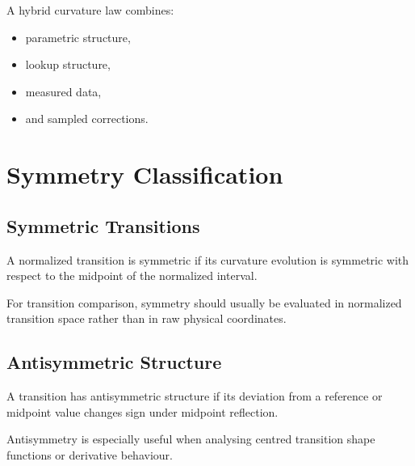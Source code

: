 \begin{definition}
\label{def:hybrid-curvature-class}
A hybrid curvature law combines:
\begin{itemize}
\item parametric structure,
\item lookup structure,
\item measured data,
\item and sampled corrections.
\end{itemize}
\end{definition}

\section{Symmetry Classification}

\subsection{Symmetric Transitions}

\begin{definition}
\label{def:classification-symmetric-transition}
A normalized transition is symmetric if its curvature evolution is
symmetric with respect to the midpoint of the normalized interval.
\end{definition}

For transition comparison, symmetry should usually be evaluated in
normalized transition space rather than in raw physical coordinates.


\subsection{Antisymmetric Structure}

\begin{definition}
\label{def:classification-antisymmetric-transition}
A transition has antisymmetric structure if its deviation from a
reference or midpoint value changes sign under midpoint reflection.
\end{definition}

Antisymmetry is especially useful when analysing centred transition
shape functions or derivative behaviour.

